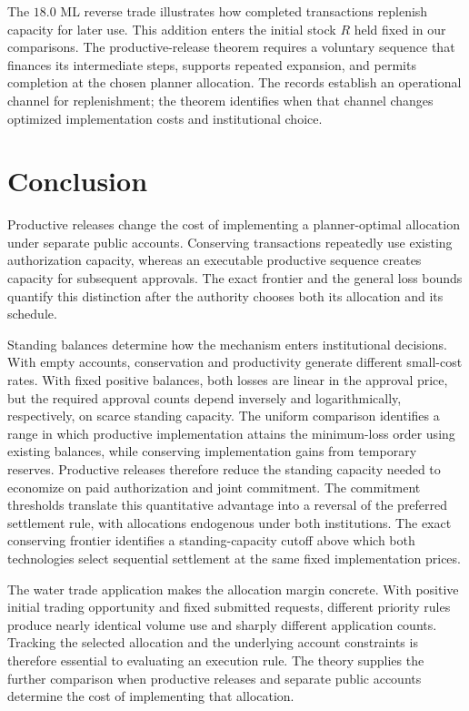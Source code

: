 \documentclass[ecta,draft]{econsocart}
\theoremstyle{definition}
\theoremstyle{definition}
\begin{document}
The $18.0$ ML reverse trade illustrates how completed transactions replenish
capacity for later use. This addition enters the initial stock $R$ held
fixed in our comparisons. The productive-release theorem requires a
voluntary sequence that finances its intermediate steps, supports repeated
expansion, and permits completion at the chosen planner allocation. The
records establish an operational channel for replenishment; the theorem
identifies when that channel changes optimized implementation costs and
institutional choice.

\section{Conclusion}
\label{sec:conclusion}

Productive releases change the cost of implementing a planner-optimal
allocation under separate public accounts. Conserving transactions repeatedly
use existing authorization capacity, whereas an executable productive sequence
creates capacity for subsequent approvals. The exact frontier and the general
loss bounds quantify this distinction after the authority chooses both its
allocation and its schedule.

Standing balances determine how the mechanism enters institutional decisions.
With empty accounts, conservation and productivity generate different
small-cost rates. With fixed positive balances, both losses are linear in the
approval price, but the required approval counts depend inversely and
logarithmically, respectively, on scarce standing capacity. The uniform
comparison identifies a range in which productive implementation attains the
minimum-loss order using existing balances, while conserving implementation
gains from temporary reserves. Productive releases therefore reduce the
standing capacity needed to economize on paid authorization and joint
commitment. The commitment thresholds translate this quantitative advantage
into a reversal of the preferred settlement rule, with allocations endogenous
under both institutions. The exact conserving frontier identifies a
standing-capacity cutoff above which both technologies select sequential
settlement at the same fixed implementation prices.

The water trade application makes the allocation margin concrete. With
positive initial trading opportunity and fixed submitted requests, different
priority rules produce nearly identical volume use and sharply different
application counts. Tracking the selected allocation and the underlying
account constraints is therefore essential to evaluating an execution rule.
The theory supplies the further comparison when productive releases and
separate public accounts determine the cost of implementing that allocation.
\end{document}
